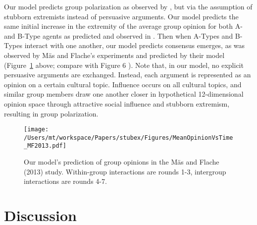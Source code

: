 
Our model predicts group polarization as
observed by , but via the assumption 
of stubborn extremists instead of persuasive arguments. 
Our model predicts the same initial increase in the extremity
of the average group opinion for both A- and B-Type agents as predicted and
observed in . Then when A-Types and B-Types interact with one
another, our model predicts consensus emerges, 
as was observed by M\"{a}s and Flache's experiments and predicted by their 
model (Figure~\ref{fig:MasFlacheComparison} above; compare with Figure 6 ). 
Note that, in our model, no explicit persuasive
arguments are exchanged. Instead, each argument is represented as an opinion
on a certain cultural topic. Influence occurs on all cultural topics, and
similar group members draw one another closer in hypothetical 
12-dimensional opinion space through attractive social influence
and stubborn extremism, resulting in group polarization.

\begin{figure} %
    \centering
    \noautomath
  \texttt{[image: /Users/mt/workspace/Papers/stubex/Figures/MeanOpinionVsTime\_MF2013.pdf]}
  \caption{Our model's prediction of group opinions in the M\"{a}s and Flache (2013) study. 
  Within-group interactions are rounds 1-3, intergroup interactions are rounds 4-7.}
  \label{fig:MasFlacheComparison}
  \vspace{-1em}
\end{figure}




\section{Discussion}

